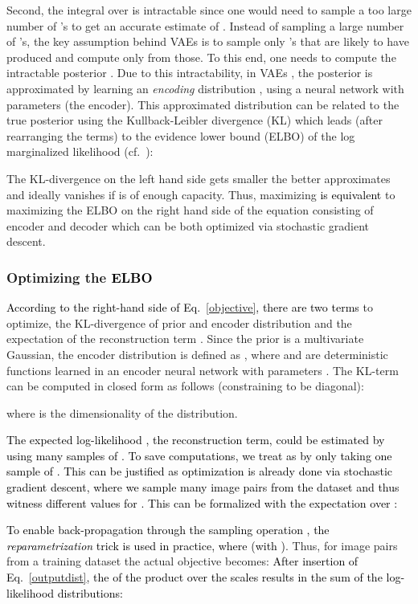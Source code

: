 \documentclass[journal]{IEEEtran}
\newcommand{\update}[1]{\textcolor{black}{#1}}
\begin{document}
Second, the integral over  is intractable since one would need to sample a too large number of 's to get an accurate estimate of . Instead of sampling a large number of 's, the key assumption behind VAEs is to sample only 's that are likely to have produced  and compute  only from those. To this end, one needs to compute the intractable posterior . Due to this intractability, in VAEs \cite{kingma2013auto}, the posterior is approximated by learning an \emph{encoding} distribution , using a neural network with parameters  (the encoder). This approximated distribution can be related to the true posterior using the Kullback-Leibler divergence (KL) which leads (after rearranging the terms) to the evidence lower bound (ELBO) of the log marginalized likelihood  (cf.~\cite{kingma2013auto,kingma2014semi}):

The KL-divergence on the left hand side gets smaller the better  approximates  and ideally vanishes if  is of enough capacity. Thus, maximizing  \update{is equivalent} to maximizing the ELBO on the right hand side of the equation consisting of encoder  and decoder  which can be both optimized via stochastic gradient descent.

\subsubsection{Optimizing the \update{ELBO}}
\update{According to the right-hand side of Eq.~\ref{objective}, there are two terms} to optimize, the KL-divergence of prior  and encoder distribution  and the expectation of the reconstruction term .
Since the prior is a multivariate Gaussian, the encoder distribution is defined as , where  and  are deterministic functions learned in an encoder neural network with parameters . The KL-term can be computed in closed form as follows (constraining  to be diagonal):

where  is the dimensionality of the distribution. 

\update{The expected log-likelihood , the reconstruction term, could be estimated by using many samples of . To save computations, we treat  as  by only taking one sample of . This can be justified as optimization is already done via stochastic gradient descent, where we sample many image pairs  from the dataset  and thus witness different values for . This can be formalized with the expectation over :}

\update{To enable back-propagation through the sampling operation , the \emph{reparametrization} trick \cite{kingma2013auto} is used in practice, where  (with )}. Thus, for image pairs  from a training dataset  the actual objective becomes:
\update{}
\update{After insertion of Eq.~\ref{outputdist}, the  of the product over the scales  results in the sum of the log-likelihood distributions:}
\end{document}
